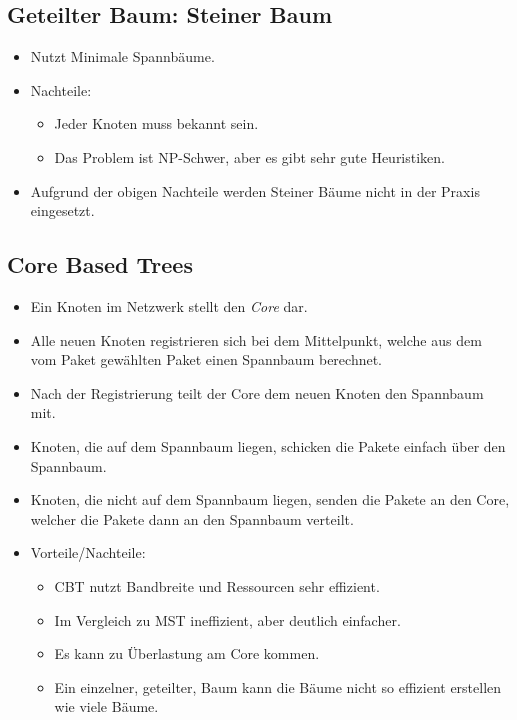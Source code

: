 		\subsection{Geteilter Baum: Steiner Baum}
			\begin{itemize}
				\item Nutzt Minimale Spannbäume.
				\item Nachteile:
					\begin{itemize}
						\item Jeder Knoten muss bekannt sein.
						\item Das Problem ist NP-Schwer, aber es gibt sehr gute Heuristiken.
					\end{itemize}
				\item Aufgrund der obigen Nachteile werden Steiner Bäume nicht in der Praxis eingesetzt.
			\end{itemize}

		\subsection{Core Based Trees}
			\begin{itemize}
				\item Ein Knoten im Netzwerk stellt den \textit{Core} dar.
				\item Alle neuen Knoten registrieren sich bei dem Mittelpunkt, welche aus dem vom Paket gewählten Paket einen Spannbaum berechnet.
				\item Nach der Registrierung teilt der Core dem neuen Knoten den Spannbaum mit.
				\item Knoten, die auf dem Spannbaum liegen, schicken die Pakete einfach über den Spannbaum.
				\item Knoten, die nicht auf dem Spannbaum liegen, senden die Pakete an den Core, welcher die Pakete dann an den Spannbaum verteilt.
				\item Vorteile/Nachteile:
					\begin{itemize}
						\item CBT nutzt Bandbreite und Ressourcen sehr effizient.
						\item Im Vergleich zu MST ineffizient, aber deutlich einfacher.
						\item Es kann zu Überlastung am Core kommen.
						\item Ein einzelner, geteilter, Baum kann die Bäume nicht so effizient erstellen wie viele Bäume.
					\end{itemize}
			\end{itemize}

